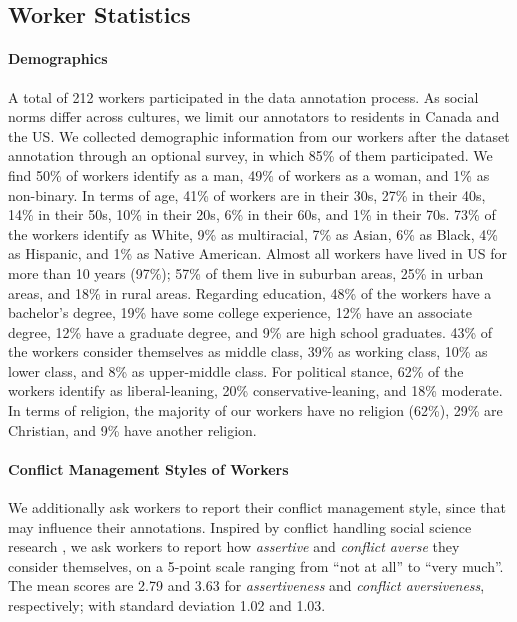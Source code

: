 \documentclass[11pt]{article}
\begin{document}
\subsection{Worker Statistics}
\label{app:workers}

\paragraph{Demographics}

A total of 212 workers participated in the data annotation process.
As social norms differ across cultures, we limit our annotators to residents in Canada and the US.
We collected demographic information from our workers after the dataset annotation through an optional survey, in which 85\% of them participated.
We find 50\% of workers identify as a man, 49\% of workers as a woman, and 1\% as non-binary.
In terms of age, 41\% of workers are in their 30s, 27\% in their 40s, 14\% in their 50s, 10\% in their 20s, 6\% in their 60s, and 1\% in their 70s.
73\% of the workers identify as White, 9\% as multiracial, 7\% as Asian, 6\% as Black, 4\% as Hispanic, and 1\% as Native American.
Almost all workers have lived in US for more than 10 years (97\%); 57\% of them live in suburban areas, 25\% in urban areas, and 18\% in rural areas.
Regarding education, 48\% of the workers have a bachelor's degree, 19\% have some college experience, 12\% have an associate degree, 12\% have a graduate degree, and 9\% are high school graduates.
43\% of the workers consider themselves as middle class, 39\% as working class, 10\% as lower class, and 8\% as upper-middle class.
For political stance, 62\% of the workers identify as liberal-leaning, 20\% conservative-leaning, and 18\% moderate.
In terms of religion, the majority of our workers have no religion (62\%), 29\% are Christian, and 9\% have another religion.

\paragraph{Conflict Management Styles of Workers}

We additionally ask workers to report their conflict management style, since that may influence their annotations.
Inspired by conflict handling social science research \cite{dechurch2001maximizing,rahim2002toward}, we ask workers to report how \textit{assertive} and \textit{conflict averse} they consider themselves, on a 5-point scale ranging from ``not at all'' to ``very much''.
The mean scores are 2.79 and 3.63 for \textit{assertiveness} and \textit{conflict aversiveness}, respectively; with standard deviation 1.02 and 1.03.
\end{document}
